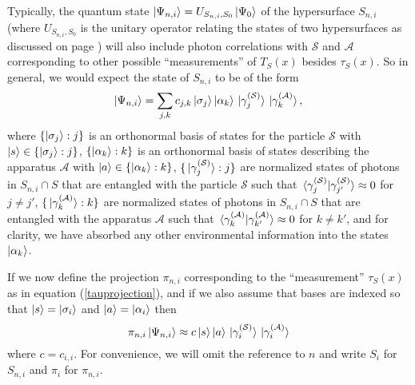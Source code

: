 Typically, the quantum state $\ket{\Psi_{n,i}}=U_{S_{n,i},S_0}\ket{\Psi_0}$ of the hypersurface $S_{n,i}$ (where  $U_{S_{n,i},S_0}$ is the unitary operator relating the states of two hypersurfaces as discussed on page \pageref{SchwingerUnitaryOP}) will also include photon correlations with $\mathcal{S}$ and $\mathcal{A}$ corresponding to other possible ``measurements'' of $T_S(x)$ besides $\tau_S(x)$. So in general, we would expect the state of $S_{n,i}$ to be of the form
$$ \ket{\Psi_{n,i}}=\sum_{j,k}c_{j,k}\ket{\sigma_j}\ket{\alpha_k}\ket*{\gamma_j^{(\mathcal{S})}}\ket*{\gamma_k^{(\mathcal{A})}},$$
where $\{\ket{\sigma_j}:j\}$ 
is an orthonormal basis of states for the particle $\mathcal{S}$ with $\ket{s}\in\{\ket{\sigma_j}:j\}$,   $\{\ket{\alpha_k}:k\}$ 
is an orthonormal basis of states describing the apparatus $\mathcal{A}$ with $\ket{a}\in\{\ket{\alpha_k}:k\}$,  $\{\ket*{\gamma_j^{(\mathcal{S})}}:j\}$ 
are normalized states of photons in $S_{n,i}\cap S$ that are entangled with the particle $\mathcal{S}$ such that $\ip*{\gamma_j^{(\mathcal{S})}}{\gamma_{j'}^{(\mathcal{S})}}\approx 0$ for $j\neq j'$,   $\{\ket*{\gamma_k^{(\mathcal{A})}}:k\}$  are normalized states of photons in $S_{n,i}\cap S$ that are entangled with the apparatus $\mathcal{A}$ such that $\ip*{\gamma_k^{(\mathcal{A})}}{\gamma_{k'}^{(\mathcal{A})}}\approx 0$ for $k\neq k'$, and for clarity, we have absorbed any other environmental information into the states $\ket{\alpha_k}$. 

If we now define the projection $\pi_{n,i}$ corresponding to the ``measurement'' $\tau_S(x)$ as in equation (\ref{tauprojection}), and if we also assume that bases are indexed so that $\ket{s}=\ket{\sigma_i}$
 and $\ket{a}=\ket{\alpha_i}$ then
 $$\pi_{n,i}\ket{\Psi_{n,i}}\approx c\ket{s}\ket{a}\ket*{\gamma_i^{(\mathcal{S})}}\ket*{\gamma_i^{(\mathcal{A})}}$$
 where $c=c_{i,i}$. For convenience, we will omit the reference to $n$ and write $S_i$ for $S_{n,i}$ and $\pi_i$ for $\pi_{n,i}$.


